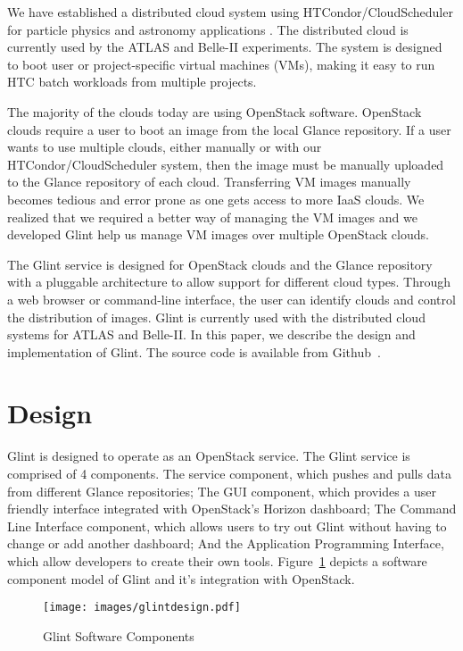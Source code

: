 \documentclass[a4paper]{jpconf}
\begin{document}
We have established a distributed cloud system using HTCondor/CloudScheduler for particle physics and astronomy applications \cite{hpcs:cloudpaper, sobie-nyc-cloud}. The distributed cloud is currently used by the ATLAS \cite{ryan-chep} and Belle-II \cite{sobie-chep} experiments. The system is designed to boot user or project-specific virtual machines (VMs), making it easy to run HTC batch workloads from multiple projects.

The majority of the clouds today are using OpenStack software. OpenStack clouds require a user to boot an image from the local Glance repository. If a user wants to use multiple clouds, either manually or with our HTCondor/CloudScheduler system, then the image must be manually uploaded to the Glance repository of each cloud. Transferring VM images manually becomes tedious and error prone as one gets access to more IaaS clouds. We realized that we required a better way of managing the VM images and we developed Glint help us manage VM images over multiple OpenStack clouds.

The Glint service is designed for OpenStack clouds and the Glance repository with a pluggable architecture to allow support for different cloud types. Through a web browser or command-line interface, the user can identify clouds and control the distribution of images. Glint is currently used with the distributed cloud systems for ATLAS and Belle-II. In this paper, we describe the design and implementation of Glint. The source code is available from Github~\cite{glint}.

\section{Design}
Glint is designed to operate as an OpenStack service. The Glint service is comprised of 4 components. The service component, which pushes and pulls data from different Glance repositories; The GUI component, which provides a user friendly interface integrated with OpenStack's Horizon dashboard; The Command Line Interface component, which allows users to try out Glint without having to change or add another dashboard; And the Application Programming Interface, which allow developers to create their own tools. Figure~\ref{fig:glintfigure_cm} depicts a software component model of Glint and it's integration with OpenStack. 

\begin{figure}[ht]
\begin{center}
\texttt{[image: images/glintdesign.pdf]}
\caption{\label{fig:glintfigure_cm}Glint Software Components}
\end{center}
\end{figure}
\end{document}
